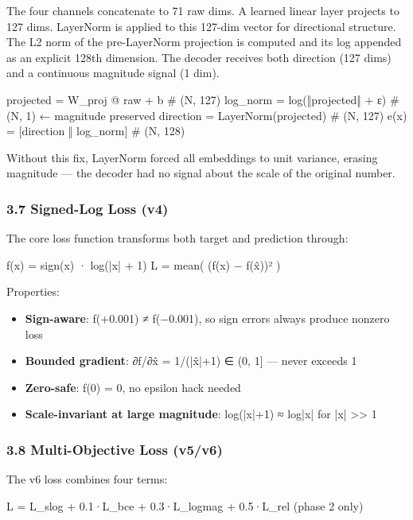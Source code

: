 \documentclass[11pt]{article}
\begin{document}
The four channels concatenate to 71 raw dims. A learned linear layer projects to 127 dims. LayerNorm is applied to this 127-dim vector for directional structure. The L2 norm of the pre-LayerNorm projection is computed and its log appended as an explicit 128th dimension. The decoder receives both direction (127 dims) and a continuous magnitude signal (1 dim).


\begin{CodeBlock}
projected = W_proj @ raw + b          # (N, 127)
log_norm  = log(‖projected‖ + ε)      # (N, 1)  ← magnitude preserved
direction = LayerNorm(projected)      # (N, 127)
e(x)      = [direction ‖ log_norm]    # (N, 128)
\end{CodeBlock}


Without this fix, LayerNorm forced all embeddings to unit variance, erasing magnitude — the decoder had no signal about the scale of the original number.


\subsubsection*{3.7 Signed-Log Loss (v4)}


The core loss function transforms both target and prediction through:


\begin{CodeBlock}
f(x) = sign(x) · log(|x| + 1)
L    = mean( (f(x) − f(x̂))² )
\end{CodeBlock}


Properties:

\begin{itemize}
\item \textbf{Sign-aware}: f(+0.001) ≠ f(−0.001), so sign errors always produce nonzero loss
\item \textbf{Bounded gradient}: ∂f/∂x̂ = 1/(|x̂|+1) ∈ (0, 1] — never exceeds 1
\item \textbf{Zero-safe}: f(0) = 0, no epsilon hack needed
\item \textbf{Scale-invariant at large magnitude}: log(|x|+1) ≈ log|x| for |x| >> 1
\end{itemize}


\subsubsection*{3.8 Multi-Objective Loss (v5/v6)}


The v6 loss combines four terms:


\begin{CodeBlock}
L = L_slog + 0.1·L_bce + 0.3·L_logmag + 0.5·L_rel (phase 2 only)
\end{CodeBlock}
\end{document}
